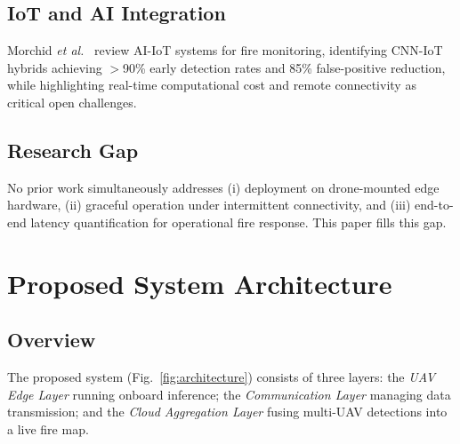 \documentclass[conference]{IEEEtran}
\begin{document}
\subsection{IoT and AI Integration}
Morchid \textit{et al.}~\cite{morchid2025fire} review AI-IoT systems
for fire monitoring, identifying CNN-IoT hybrids achieving $>$90\%
early detection rates and 85\% false-positive reduction, while
highlighting real-time computational cost and remote connectivity as
critical open challenges.

\subsection{Research Gap}
No prior work simultaneously addresses (i) deployment on drone-mounted
edge hardware, (ii) graceful operation under intermittent connectivity,
and (iii) end-to-end latency quantification for operational fire
response. This paper fills this gap.

\section{Proposed System Architecture}
\label{sec:architecture}

\subsection{Overview}

The proposed system (Fig.~\ref{fig:architecture}) consists of three
layers: the \textit{UAV Edge Layer} running onboard inference; the
\textit{Communication Layer} managing data transmission; and the
\textit{Cloud Aggregation Layer} fusing multi-UAV detections into a
live fire map.
\end{document}
